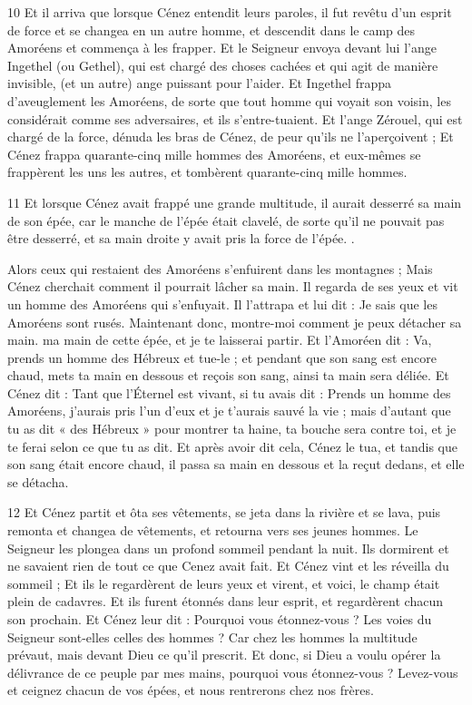 \par 10 Et il arriva que lorsque Cénez entendit leurs paroles, il fut revêtu d'un esprit de force et se changea en un autre homme, et descendit dans le camp des Amoréens et commença à les frapper. Et le Seigneur envoya devant lui l'ange Ingethel (ou Gethel), qui est chargé des choses cachées et qui agit de manière invisible, (et un autre) ange puissant pour l'aider. Et Ingethel frappa d'aveuglement les Amoréens, de sorte que tout homme qui voyait son voisin, les considérait comme ses adversaires, et ils s'entre-tuaient. Et l'ange Zérouel, qui est chargé de la force, dénuda les bras de Cénez, de peur qu'ils ne l'aperçoivent ; Et Cénez frappa quarante-cinq mille hommes des Amoréens, et eux-mêmes se frappèrent les uns les autres, et tombèrent quarante-cinq mille hommes.

\par 11 Et lorsque Cénez avait frappé une grande multitude, il aurait desserré sa main de son épée, car le manche de l'épée était clavelé, de sorte qu'il ne pouvait pas être desserré, et sa main droite y avait pris la force de l'épée. .

\par Alors ceux qui restaient des Amoréens s'enfuirent dans les montagnes ; Mais Cénez cherchait comment il pourrait lâcher sa main. Il regarda de ses yeux et vit un homme des Amoréens qui s'enfuyait. Il l'attrapa et lui dit : Je sais que les Amoréens sont rusés. Maintenant donc, montre-moi comment je peux détacher sa main. ma main de cette épée, et je te laisserai partir. Et l'Amoréen dit : Va, prends un homme des Hébreux et tue-le ; et pendant que son sang est encore chaud, mets ta main en dessous et reçois son sang, ainsi ta main sera déliée. Et Cénez dit : Tant que l'Éternel est vivant, si tu avais dit : Prends un homme des Amoréens, j'aurais pris l'un d'eux et je t'aurais sauvé la vie ; mais d'autant que tu as dit « des Hébreux » pour montrer ta haine, ta bouche sera contre toi, et je te ferai selon ce que tu as dit. Et après avoir dit cela, Cénez le tua, et tandis que son sang était encore chaud, il passa sa main en dessous et la reçut dedans, et elle se détacha.

\par 12 Et Cénez partit et ôta ses vêtements, se jeta dans la rivière et se lava, puis remonta et changea de vêtements, et retourna vers ses jeunes hommes. Le Seigneur les plongea dans un profond sommeil pendant la nuit. Ils dormirent et ne savaient rien de tout ce que Cenez avait fait. Et Cénez vint et les réveilla du sommeil ; Et ils le regardèrent de leurs yeux et virent, et voici, le champ était plein de cadavres. Et ils furent étonnés dans leur esprit, et regardèrent chacun son prochain. Et Cénez leur dit : Pourquoi vous étonnez-vous ? Les voies du Seigneur sont-elles celles des hommes ? Car chez les hommes la multitude prévaut, mais devant Dieu ce qu'il prescrit. Et donc, si Dieu a voulu opérer la délivrance de ce peuple par mes mains, pourquoi vous étonnez-vous ? Levez-vous et ceignez chacun de vos épées, et nous rentrerons chez nos frères.

